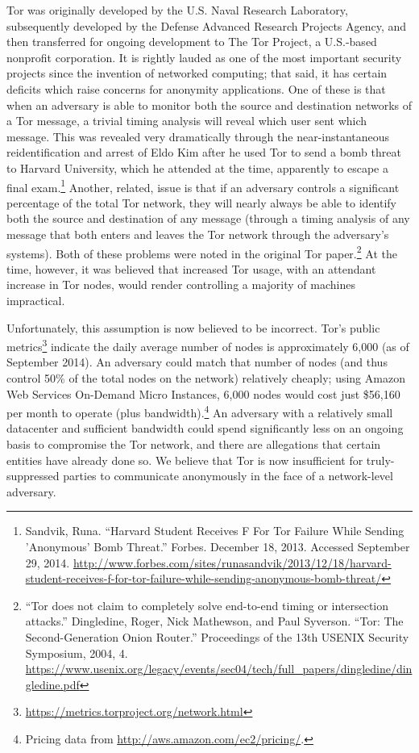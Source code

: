 \documentclass[12pt]{article}
\begin{document}
  Tor was originally developed by the U.S. Naval Research Laboratory, subsequently developed by the Defense Advanced Research Projects Agency, and then transferred for ongoing development to The Tor Project, a U.S.-based nonprofit corporation. It is rightly lauded as one of the most important security projects since the invention of networked computing; that said, it has certain deficits which raise concerns for anonymity applications. One of these is that when an adversary is able to monitor both the source and destination networks of a Tor message, a trivial timing analysis will reveal which user sent which message. This was revealed very dramatically through the near-instantaneous reidentification and arrest of Eldo Kim after he used Tor to send a bomb threat to Harvard University, which he attended at the time, apparently to escape a final exam.\footnote{Sandvik, Runa. ``Harvard Student Receives F For Tor Failure While Sending 'Anonymous' Bomb Threat.'' Forbes. December 18, 2013. Accessed September 29, 2014. \url{http://www.forbes.com/sites/runasandvik/2013/12/18/harvard-student-receives-f-for-tor-failure-while-sending-anonymous-bomb-threat/}} Another, related, issue is that if an adversary controls a significant percentage of the total Tor network, they will nearly always be able to identify both the source and destination of any message (through a timing analysis of any message that both enters and leaves the Tor network through the adversary's systems). Both of these problems were noted in the original Tor paper.\footnote{``Tor does not claim to completely solve end-to-end timing or intersection attacks.'' Dingledine, Roger, Nick Mathewson, and Paul Syverson. ``Tor: The Second-Generation Onion Router.'' Proceedings of the 13th USENIX Security Symposium, 2004, 4. \url{https://www.usenix.org/legacy/events/sec04/tech/full_papers/dingledine/dingledine.pdf}} At the time, however, it was believed that increased Tor usage, with an attendant increase in Tor nodes, would render controlling a majority of machines impractical.
  
  Unfortunately, this assumption is now believed to be incorrect. Tor's public metrics\footnote{\url{https://metrics.torproject.org/network.html}} indicate the daily average number of nodes is approximately 6,000 (as of September 2014). An adversary could match that number of nodes (and thus control 50\% of the total nodes on the network) relatively cheaply; using Amazon Web Services On-Demand Micro Instances, 6,000 nodes would cost just \$56,160 per month to operate (plus bandwidth).\footnote{Pricing data from \url{http://aws.amazon.com/ec2/pricing/}.} An adversary with a relatively small datacenter and sufficient bandwidth could spend significantly less on an ongoing basis to compromise the Tor network, and there are allegations that certain entities have already done so. We believe that Tor is now insufficient for truly-suppressed parties to communicate anonymously in the face of a network-level adversary.
  
\end{document}
